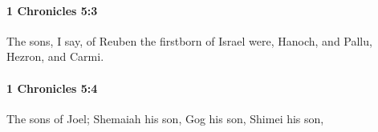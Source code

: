 		\paragraph{1 Chronicles 5:3} %
			\label{1CHRONICLES-5-3}

			The sons, I say, of Reuben the firstborn of Israel were, Hanoch, and Pallu, Hezron, and Carmi.


		\paragraph{1 Chronicles 5:4} %
			\label{1CHRONICLES-5-4}

			The sons of Joel; Shemaiah his son, Gog his son, Shimei his son,


